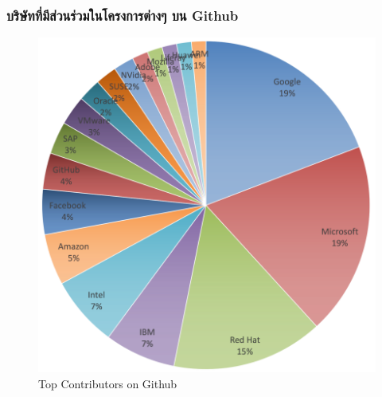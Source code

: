 \begin{frame}[t]
  \frametitle{บริษัทที่มีส่วนร่วมในโครงการต่างๆ บน Github}

  \begin{center}
    \begin{figure}[h!]
      \includegraphics[height=.63\paperheight]{images/github-top.png}
      \caption*{\tiny{Top Contributors on Github} \footnotemark[12]}
    \end{figure}
  \end{center}
\end{frame}